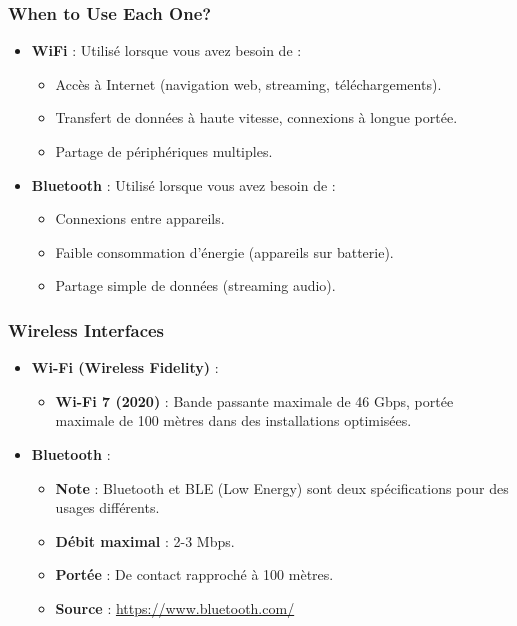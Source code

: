 \documentclass[10pt,a4paper]{article}
\begin{document}
\subsubsection*{When to Use Each One?}
\begin{itemize}
    \item \textbf{WiFi} : Utilisé lorsque vous avez besoin de :
    \begin{itemize}
        \item Accès à Internet (navigation web, streaming, téléchargements).
        \item Transfert de données à haute vitesse, connexions à longue portée.
        \item Partage de périphériques multiples.
    \end{itemize}
    \item \textbf{Bluetooth} : Utilisé lorsque vous avez besoin de :
    \begin{itemize}
        \item Connexions entre appareils.
        \item Faible consommation d'énergie (appareils sur batterie).
        \item Partage simple de données (streaming audio).
    \end{itemize}
\end{itemize}

\subsubsection*{Wireless Interfaces}
\begin{itemize}
    \item \textbf{Wi-Fi (Wireless Fidelity)} :
    \begin{itemize}
        \item \textbf{Wi-Fi 7 (2020)} : Bande passante maximale de 46 Gbps, portée maximale de 100 mètres dans des installations optimisées.
    \end{itemize}
    \item \textbf{Bluetooth} :
    \begin{itemize}
        \item \textbf{Note} : Bluetooth et BLE (Low Energy) sont deux spécifications pour des usages différents.
        \item \textbf{Débit maximal} : 2-3 Mbps.
        \item \textbf{Portée} : De contact rapproché à 100 mètres.
    \end{itemize}
    \begin{itemize}
        \item \textbf{Source} : \url{https://www.bluetooth.com/}
    \end{itemize}
\end{itemize}
\end{document}
